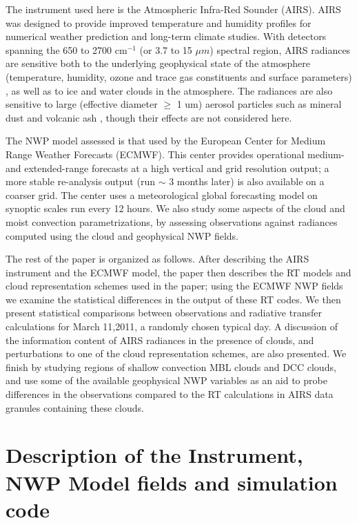 \documentclass[agupp]{aguplus}              %
\newcommand{\wn}{cm$^{-1}$\xspace}
\newcommand{\um}{$\mu m$\xspace}
\begin{document}
\begin{article}
The instrument used here is the Atmospheric Infra-Red Sounder
(AIRS)\citep{str:02*1}. AIRS was designed to provide improved
temperature and humidity profiles for numerical weather prediction and
long-term climate studies. With detectors spanning the 650 to 2700 \wn
(or 3.7 to 15 \um) spectral region, AIRS radiances are sensitive both
to the underlying geophysical state of the atmosphere (temperature,
humidity, ozone and trace gas constituents and surface parameters)
\citep{aum:02*2,str:02*2}, as well as to ice and water clouds
\citep{kah:03*1,kah:05*1,wu:09} in the atmosphere. The radiances are
also sensitive to large (effective diameter $\geq$ 1 um) aerosol
particles such as mineral dust and volcanic ash \citep{mac:10,cla:10},
though their effects are not considered here.

The NWP model assessed is that used by the European Center for Medium
Range Weather Forecasts (ECMWF). This center provides operational
medium- and extended-range forecasts at a high vertical and grid
resolution output; a more stable re-analysis output (run $\sim$ 3
months later) is also available on a coarser grid.  The center uses a
meteorological global forecasting model on synoptic scales run
every 12 hours.  We also study some aspects of the cloud
and moist convection parametrizations, by assessing observations against 
radiances computed using the cloud and geophysical NWP fields.

The rest of the paper is organized as follows. After describing the
AIRS instrument and the ECMWF model, the paper then describes the RT
models and cloud representation schemes used in the paper; using the
ECMWF NWP fields we examine the statistical differences in the output
of these RT codes. We then present statistical comparisons
between observations and radiative transfer calculations for March
11,2011, a randomly chosen typical day. A discussion of the
information content of AIRS radiances in the presence of clouds, and
perturbations to one of the cloud representation schemes, are also
presented. We finish by studying regions of shallow convection MBL clouds
and DCC clouds, and use some of the available geophysical NWP
variables as an aid to probe differences in the observations compared
to the RT calculations in AIRS data granules containing these clouds.

\section{Description of the Instrument, NWP Model fields and simulation code}


\end{article}
\end{document}
